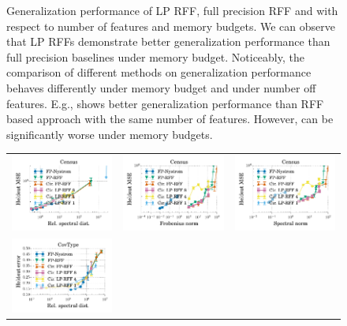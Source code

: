 \begin{figure}
\begin{tabular}{@{\hskip 0in}c@{\hskip 0in}c@{\hskip 0in}c@{\hskip 0in}c@{\hskip 0in}}
	\end{tabular}
	\caption{Generalization performance of LP RFF, full precision RFF and \Nystrom with respect to number of features and memory budgets. We can observe that LP RFFs demonstrate better generalization performance than full precision baselines under memory budget. Noticeably, the comparison of different methods on generalization performance behaves differently under memory budget and under number off features. E.g., \Nystrom shows better generalization performance than RFF based approach with the same number of features. However, \Nystrom can be significantly worse under memory budgets.}
	\label{fig:generalization_col_app}
\end{figure}

\begin{figure}
	\centering
	\begin{tabular}{@{\hskip -0.25in}c@{\hskip -0.25in}c@{\hskip -0.25in}c@{\hskip -0.25in}}
		\includegraphics[width=0.33\linewidth]{figures/regression_l2_vs_delta_all_line.pdf} &
		\includegraphics[width=0.33\linewidth]{figures/regression_l2_vs_f_norm_all_line.pdf} &
		\includegraphics[width=0.33\linewidth]{figures/regression_l2_vs_s_norm_all_line.pdf} \\
		\includegraphics[width=0.33\linewidth]{figures/classification_acc_vs_delta_all_line.pdf} &

\end{tabular}
\end{figure}
